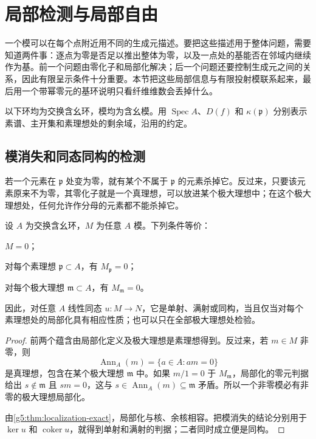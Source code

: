 
% 
% 
% 

\section{局部检测与局部自由}
\label{g5:sec:0205}

一个模可以在每个点附近用不同的生成元描述。要把这些描述用于整体问题，需要知道两件事：逐点为零是否足以推出整体为零，以及一点处的基能否在邻域内继续作为基。前一个问题由零化子和局部化解决；后一个问题还要控制生成元之间的关系，因此有限呈示条件十分重要。本节把这些局部信息与有限投射模联系起来，最后用一个带幂零元的基环说明只看纤维维数会丢掉什么。

\ProseParagraphBreak

以下环均为交换含幺环，模均为含幺模。用 \(\operatorname{Spec}A\)、\(D(f)\) 和 \(\kappa(\mathfrak p)\) 分别表示素谱、主开集和素理想处的剩余域，沿用的约定。

\subsection{模消失和同态同构的检测}
\label{g5:subsec:0205:01}

若一个元素在 \(\mathfrak p\) 处变为零，就有某个不属于 \(\mathfrak p\) 的元素杀掉它。反过来，只要该元素原来不为零，其零化子就是一个真理想，可以放进某个极大理想中；在这个极大理想处，任何允许作分母的元素都不能杀掉它。

\begin{proposition}
\label{g5:prop:local-detection}
	设 \(A\) 为交换含幺环，\(M\) 为任意 \(A\) 模。下列条件等价：
	\begin{equivalences}
		\item \(M=0\)；
		\item 对每个素理想 \(\mathfrak p\subset A\)，有 \(M_{\mathfrak p}=0\)；
		\item 对每个极大理想 \(\mathfrak m\subset A\)，有 \(M_{\mathfrak m}=0\)。
	\end{equivalences}
	因此，对任意 \(A\) 线性同态 \(u:M\rightarrow N\)，它是单射、满射或同构，当且仅当对每个素理想处的局部化具有相应性质；也可以只在全部极大理想处检验。
\end{proposition}
\begin{proof}
	前两个蕴含由局部化定义及极大理想是素理想得到。反过来，若 \(m\in M\) 非零，则
	\[
		\operatorname{Ann}_A(m)=\{a\in A:am=0\}
	\]
	是真理想，包含在某个极大理想 \(\mathfrak m\) 中。如果 \(m/1=0\) 于 \(M_{\mathfrak m}\)，局部化的零元判据给出 \(s\notin\mathfrak m\) 且 \(sm=0\)，这与 \(s\in\operatorname{Ann}_A(m)\subseteq\mathfrak m\) 矛盾。所以一个非零模必有非零的极大理想局部化。

	由\cref{g5:thm:localization-exact}，局部化与核、余核相容。把模消失的结论分别用于 \(\ker u\) 和 \(\operatorname{coker}u\)，就得到单射和满射的判据；二者同时成立便是同构。
\end{proof}

